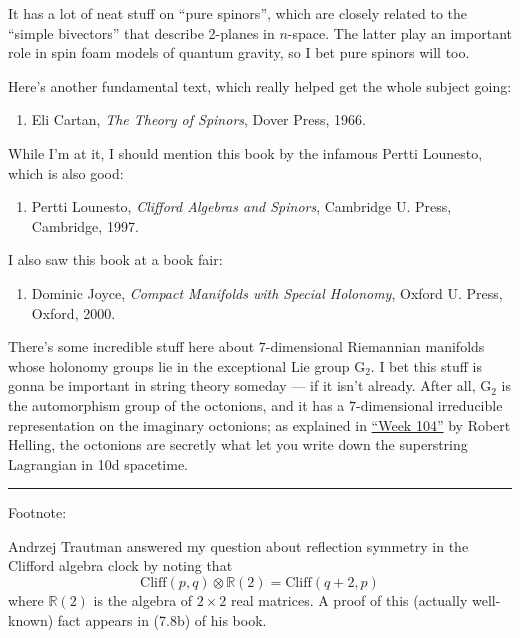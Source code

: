 \documentclass{article}
\def\tightlist{}
\begin{document}
It has a lot of neat stuff on ``pure spinors'', which are closely
related to the ``simple bivectors'' that describe 2-planes in
\(n\)-space. The latter play an important role in spin foam models of
quantum gravity, so I bet pure spinors will too.

Here's another fundamental text, which really helped get the whole
subject going:

\begin{enumerate}
\def\labelenumi{\arabic{enumi})}
\setcounter{enumi}{15}
\tightlist
\item
  Eli Cartan, \emph{The Theory of Spinors}, Dover Press, 1966.
\end{enumerate}

While I'm at it, I should mention this book by the infamous Pertti
Lounesto, which is also good:

\begin{enumerate}
\def\labelenumi{\arabic{enumi})}
\setcounter{enumi}{16}
\tightlist
\item
  Pertti Lounesto, \emph{Clifford Algebras and Spinors}, Cambridge U.
  Press, Cambridge, 1997.
\end{enumerate}

I also saw this book at a book fair:

\begin{enumerate}
\def\labelenumi{\arabic{enumi})}
\setcounter{enumi}{17}
\tightlist
\item
  Dominic Joyce, \emph{Compact Manifolds with Special Holonomy}, Oxford
  U. Press, Oxford, 2000.
\end{enumerate}

There's some incredible stuff here about \(7\)-dimensional Riemannian
manifolds whose holonomy groups lie in the exceptional Lie group
\(\mathrm{G}_2\). I bet this stuff is gonna be important in string
theory someday --- if it isn't already. After all, \(\mathrm{G}_2\) is
the automorphism group of the octonions, and it has a \(7\)-dimensional
irreducible representation on the imaginary octonions; as explained in
\protect\hyperlink{week104}{``Week 104''} by Robert Helling, the
octonions are secretly what let you write down the superstring
Lagrangian in 10d spacetime.

\begin{center}\rule{0.5\linewidth}{0.5pt}\end{center}

Footnote:

Andrzej Trautman answered my question about reflection symmetry in the
Clifford algebra clock by noting that
\[\mathrm{Cliff}(p,q) \otimes \mathbb{R}(2) = \mathrm{Cliff}(q+2,p)\]
where \(\mathbb{R}(2)\) is the algebra of \(2\times2\) real matrices. A
proof of this (actually well-known) fact appears in (7.8b) of his book.
\end{document}
